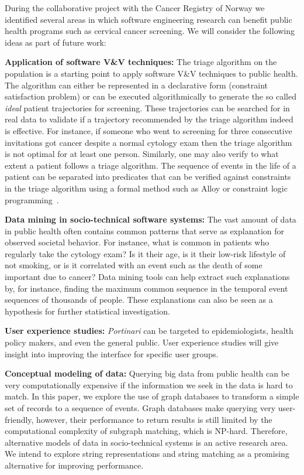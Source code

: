 \documentclass[10pt, conference]{IEEEtran}
\begin{document}
During the collaborative project with the Cancer Registry of Norway we identified several areas in which software engineering research can benefit public health programs such as cervical cancer screening. We will consider the following ideas as part of future work:

\noindent \textbf{Application of software V\&V techniques:} The triage algorithm on the population is a starting point to apply software V\&V techniques to public health. The algorithm can either be represented in a declarative form (constraint satisfaction problem) or can be executed algorithmically to generate the so called \textit{ideal} patient trajectories for screening. These trajectories can be searched for in real data to validate if a trajectory recommended by the triage algorithm indeed is effective. For instance, if someone who went to screening for three consecutive invitations got cancer despite a normal cytology exam then the triage algorithm is not optimal for at least one person.  Similarly, one may also verify to what extent a patient follows a triage algorithm. The sequence of events in the life of a patient can be separated into predicates that can be verified against constraints in the triage algorithm using a formal method such as Alloy\cite{jackson2006software} or constraint logic programming~\cite{jaffar1987constraint}. 

\noindent \textbf{Data mining in socio-technical software systems:} The vast amount of data in public health often contains common patterns that serve as explanation for observed societal behavior. For instance, what is common in patients who regularly take the cytology exam? Is it their age, is it their low-risk lifestyle of  not smoking, or is it correlated with an event such as the death of some important due to cancer? Data mining tools can help extract such explanations by, for instance, finding the maximum common sequence in the temporal event sequences of thousands of people. These explanations can also be seen as a hypothesis for further statistical investigation.

\noindent \textbf{User experience studies:} \textit{Portinari} can be targeted to  epidemiologists, health policy makers, and even the general public. User experience studies will give insight into improving the interface for specific user groups. 

\noindent \textbf{Conceptual modeling of data:} Querying big data from public health can be very computationally expensive if the information we seek in the data is hard to match. In this paper, we explore the use of graph databases to transform a simple set of records to a sequence of events. Graph databases make querying very user-friendly, however, their performance to return results is still limited by the computational complexity of subgraph matching, which is NP-hard. Therefore, alternative models of data in socio-technical  systems is an active research area. We intend to explore string representations and string matching as a promising alternative for improving performance.
\end{document}
